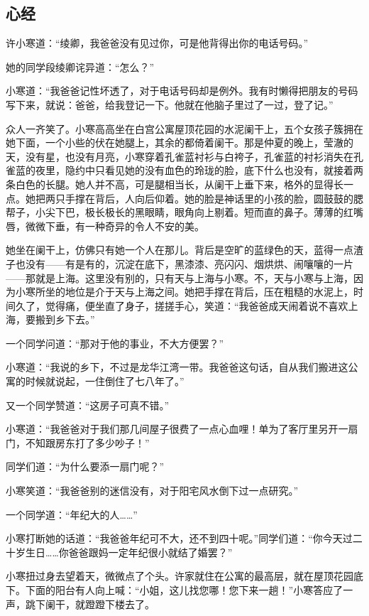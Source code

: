 \subsection{心经}

\par 许小寒道：“绫卿，我爸爸没有见过你，可是他背得出你的电话号码。”
\par 她的同学段绫卿诧异道：“怎么？”
\par 小寒道：“我爸爸记性坏透了，对于电话号码却是例外。我有时懒得把朋友的号码写下来，就说：爸爸，给我登记一下。他就在他脑子里过了一过，登了记。”
\par 众人一齐笑了。小寒高高坐在白宫公寓屋顶花园的水泥阑干上，五个女孩子簇拥在她下面，一个小些的伏在她腿上，其余的都倚着阑干。那是仲夏的晚上，莹澈的天，没有星，也没有月亮，小寒穿着孔雀蓝衬衫与白袴子，孔雀蓝的衬衫消失在孔雀蓝的夜里，隐约中只看见她的没有血色的玲珑的脸，底下什么也没有，就接着两条白色的长腿。她人并不高，可是腿相当长，从阑干上垂下来，格外的显得长一点。她把两只手撑在背后，人向后仰着。她的脸是神话里的小孩的脸，圆鼓鼓的腮帮子，小尖下巴，极长极长的黑眼睛，眼角向上剔着。短而直的鼻子。薄薄的红嘴唇，微微下垂，有一种奇异的令人不安的美。
\par 她坐在阑干上，仿佛只有她一个人在那儿。背后是空旷的蓝绿色的天，蓝得一点渣子也没有——有是有的，沉淀在底下，黑漆漆、亮闪闪、烟烘烘、闹嚷嚷的一片——那就是上海。这里没有别的，只有天与上海与小寒。不，天与小寒与上海，因为小寒所坐的地位是介于天与上海之间。她把手撑在背后，压在粗糙的水泥上，时间久了，觉得痛，便坐直了身子，搓搓手心，笑道：“我爸爸成天闹着说不喜欢上海，要搬到乡下去。”
\par 一个同学问道：“那对于他的事业，不大方便罢？”
\par 小寒道：“我说的乡下，不过是龙华江湾一带。我爸爸这句话，自从我们搬进这公寓的时候就说起，一住倒住了七八年了。”
\par 又一个同学赞道：“这房子可真不错。”
\par 小寒道：“我爸爸对于我们那几间屋子很费了一点心血哩！单为了客厅里另开一扇门，不知跟房东打了多少吵子！”
\par 同学们道：“为什么要添一扇门呢？”
\par 小寒笑道：“我爸爸别的迷信没有，对于阳宅风水倒下过一点研究。”
\par 一个同学道：“年纪大的人……”
\par 小寒打断她的话道：“我爸爸年纪可不大，还不到四十呢。”同学们道：“你今天过二十岁生日……你爸爸跟妈一定年纪很小就结了婚罢？”
\par 小寒扭过身去望着天，微微点了个头。许家就住在公寓的最高层，就在屋顶花园底下。下面的阳台有人向上喊：“小姐，这儿找您哪！您下来一趟！”小寒答应了一声，跳下阑干，就蹬蹬下楼去了。
